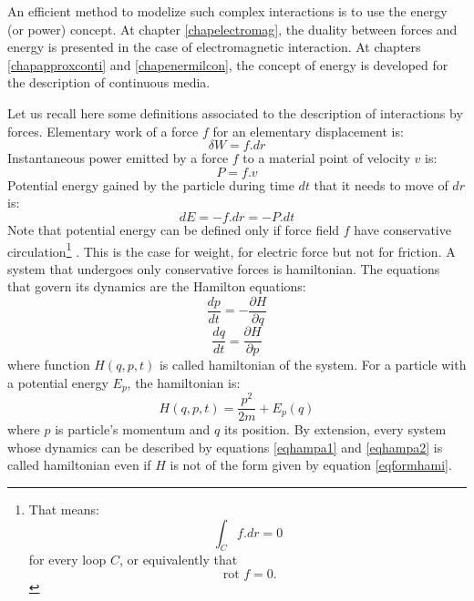 \documentclass[12pt]{book}
\begin{document}
An efficient method to modelize such complex interactions is to use the energy
(or power) concept. At chapter \ref{chapelectromag}, the duality between
forces and energy is presented in the case of electromagnetic interaction.
At chapters \ref{chapapproxconti} and \ref{chapenermilcon}, the concept of
energy is developed for the description of continuous media.

Let us recall here some definitions associated to the description of
interactions by forces. Elementary work of a force $f$ for an elementary
displacement is:
\begin{equation}
\delta W=f.dr
\end{equation}
Instantaneous power emitted by a force $f$ to a material point of velocity $v$
is: 
\begin{equation}
P=f.v
\end{equation}
Potential energy gained by the particle during time $dt$ that it needs to move
of $dr$ is:
\begin{equation}
dE=-f.dr=-P.dt
\end{equation}
Note that potential energy can be defined only if force field $f$ have
conservative circulation\footnote{%
That means:
\begin{equation}
\int_C f.dr=0
\end{equation}
for every loop $C$, or equivalently that
\begin{equation}
\mbox{ rot } f=0.
\end{equation}
}%
. This is the case for weight, for electric force but not for friction. A
system that undergoes only conservative forces is hamiltonian. The equations
that govern its dynamics are the Hamilton equations:
\begin{equation}\label{eqhampa1}
\frac{dp}{dt}=-\frac{\partial H}{\partial q}
\end{equation}
\begin{equation}\label{eqhampa2}
\frac{dq}{dt}=\frac{\partial H}{\partial p}
\end{equation}
where function $H(q,p,t)$ is called hamiltonian of the system. For a particle
with a potential energy $E_p$, the hamiltonian is:
\begin{equation}\label{eqformhami}
H(q,p,t)=\frac{p^2}{2m}+E_p(q)
\end{equation}
where $p$ is particle's momentum and $q$ its position.
By extension, every system whose dynamics can be described by equations
\ref{eqhampa1} and \ref{eqhampa2} is called hamiltonian
even if $H$ is not of the form given by equation
\ref{eqformhami}. 
\end{document}
